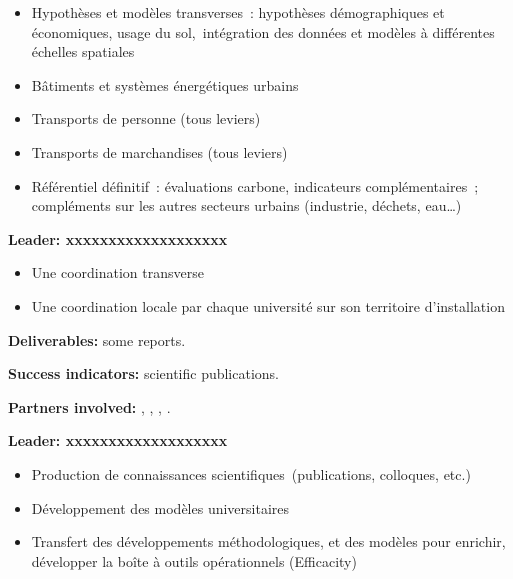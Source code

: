 \begin{itemize}
    \item Hypothèses et modèles transverses : hypothèses démographiques et économiques, usage du sol, intégration des données et modèles à différentes échelles spatiales 
    \item Bâtiments et systèmes énergétiques urbains
    \item Transports de personne (tous leviers)
    \item Transports de marchandises (tous leviers)
    \item Référentiel définitif : évaluations carbone, indicateurs complémentaires ; compléments sur les autres secteurs urbains (industrie, déchets, eau…)
\end{itemize}



\textbf{Leader: xxxxxxxxxxxxxxxxxxx}

\begin{itemize}
    \item Une coordination transverse 
    \item Une coordination locale par chaque université sur son territoire d’installation
\end{itemize}



\vspace{0.25cm}
\noindent\textbf{Deliverables:} some reports.

\noindent\textbf{Success indicators:} scientific publications.

\noindent\textbf{Partners involved:} , , , .



\textbf{Leader: xxxxxxxxxxxxxxxxxxx}
\begin{itemize}
    \item     Production de connaissances scientifiques (publications, colloques, etc.)
    \item Développement des modèles universitaires
    \item Transfert des développements méthodologiques, et des modèles pour enrichir, développer la boîte à outils opérationnels (Efficacity) 
\end{itemize}



